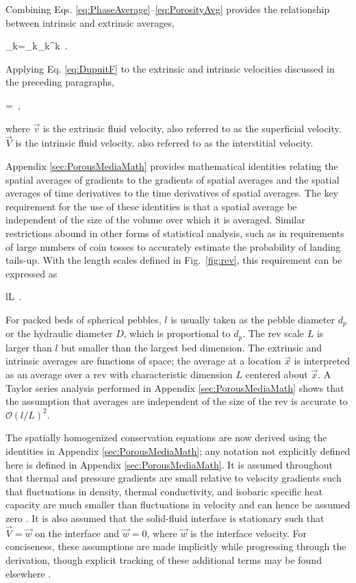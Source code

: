 Combining Eqs. \eqref{eq:PhaseAverage}--\eqref{eq:PorosityAvg} provides the relationship between intrinsic and extrinsic averages,

\beq
\label{eq:DupuitF}
\la\Phi_k\ra=\epsilon_k\la\Phi_k\ra^k\ .
\eeq

\noindent Applying Eq. \eqref{eq:DupuitF} to the extrinsic and intrinsic velocities discussed in the preceding paragraphs,

\beq
\label{eq:DupuitForchiemer}
=\epsilon{}\ ,
\eeq

\noindent where \(\vec{v}\) is the extrinsic fluid velocity, also referred to as the superficial velocity. \(\vec{V}\) is the intrinsic fluid velocity, also referred to as the interstitial velocity. 

Appendix \ref{sec:PorousMediaMath} provides mathematical identities relating the spatial averages of gradients to the gradients of spatial averages and the spatial averages of time derivatives to the time derivatives of spatial averages. The key requirement for the use of these identities is that a spatial average be independent of the size of the volume over which it is averaged. Similar restrictions abound in other forms of statistical analysis, such as in requirements of large numbers of coin tosses to accurately estimate the probability of landing tails-up. With the length scales defined in Fig.\ \ref{fig:rev}, this requirement can be expressed as

\beq
\label{eq:LengthReqs}
l\ll L\ .
\eeq

\noindent For packed beds of spherical pebbles, \(l\) is usually taken as the pebble diameter \(d_p\) or the hydraulic diameter \(D\), which is proportional to \(d_p\). The \gls{rev} scale \(L\) is larger than \(l\) but smaller than the largest bed dimension. The extrinsic and intrinsic averages are functions of space; the average at a location \(\vec{x}\) is interpreted as an average over a \gls{rev} with characteristic dimension \(L\) centered about \(\vec{x}\). A Taylor series analysis performed in Appendix \ref{sec:PorousMediaMath} shows that the assumption that averages are independent of the size of the \gls{rev} is accurate to \(\mathcal{O}(l/L)^2\).

The spatially homogenized conservation equations are now derived using the identities in Appendix \ref{sec:PorousMediaMath}; any notation not explicitly defined here is defined in Appendix \ref{sec:PorousMediaMath}. It is assumed throughout that thermal and pressure gradients are small relative to velocity gradients such that fluctuations in density, thermal conductivity, and isobaric specific heat capacity are much smaller than fluctuations in velocity and can hence be assumed zero \cite{gray}. It is also assumed that the solid-fluid interface is stationary such that \(\vec{V}=\vec{w}\) on the interface and \(\vec{w}=0\), where \(\vec{w}\) is the interface velocity. For conciseness, these assumptions are made implicitly while progressing through the derivation, though explicit tracking of these additional terms may be found elsewhere \cite{novak_manual}.

